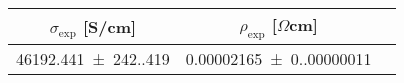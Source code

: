 \begin{tabular}{ccc}
\toprule
$\sigma_{\exp}$ [S/cm] & $\rho_{\exp}$ [$\Omega$cm] \\
\midrule
\num{46192.441(242.419)} & \num{0.00002165(0.00000011)} \\
\bottomrule
\end{tabular}
